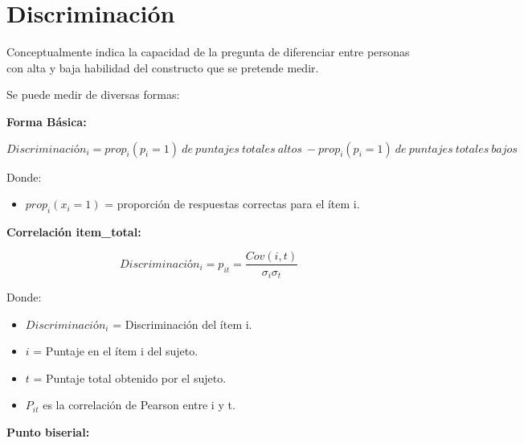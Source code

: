 \documentclass[
  letterpaper,
  DIV=11,
  numbers=noendperiod]{scrreprt}
\providecommand{\tightlist}{%
  \setlength{\itemsep}{0pt}\setlength{\parskip}{0pt}}
\begin{document}
\section{Discriminación}\label{discriminaciuxf3n}

Conceptualmente indica la capacidad de la pregunta de diferenciar entre
personas con alta y baja habilidad del constructo que se pretende medir.

Se puede medir de diversas formas:

\textbf{Forma Básica:}

\[
Discriminación_i = prop_i(p_i=1)\ de\ puntajes\ totales\ altos\ - prop_i(p_i=1)\ de\ puntajes\ totales\ bajos
\]

Donde:

\begin{itemize}
\tightlist
\item
  \(prop_i(x_i = 1)\) = proporción de respuestas correctas para el ítem
  i.
\end{itemize}

\textbf{Correlación item\_total:}

\[
Discriminación_i = p_{it} = \frac{Cov(i,t)}{\sigma_i\sigma_t}
\]

Donde:

\begin{itemize}
\item
  \(Discriminación_i\) = Discriminación del ítem i.
\item
  \(i\) = Puntaje en el ítem i del sujeto.
\item
  \(t\) = Puntaje total obtenido por el sujeto.
\item
  \(P_{it}\) es la correlación de Pearson entre i y t.
\end{itemize}

\textbf{Punto biserial:}
\end{document}
